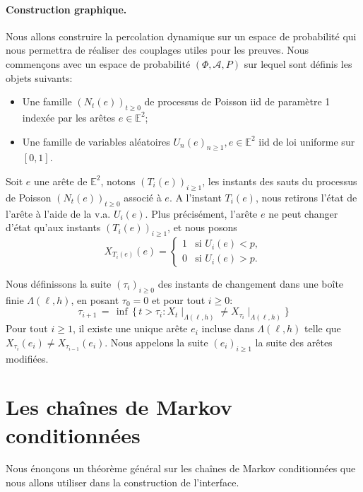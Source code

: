 \documentclass[titlepage,a4paper,12pt]{article}
\begin{document}
\paragraph{Construction graphique.} Nous allons construire la percolation dynamique sur un espace de probabilité qui nous permettra de réaliser des couplages utiles pour les preuves. Nous commençons avec un espace de probabilité $(\Phi, \mathcal{A},P)$ sur lequel sont définis les objets suivants:

\begin{itemize}[label = $\bullet$, leftmargin = *]
\item Une famille $(N_t(e))_{t\geqslant 0}$ de processus de Poisson iid de paramètre 1 indexée par les arêtes $e \in \mathbb{E}^2$;
\item Une famille de variables aléatoires $U_n(e)_{n\geqslant 1}, e\in \mathbb{E}^2$ iid de loi uniforme sur $[0,1]$.
\end{itemize} 


Soit $e$ une arête de $\mathbb{E}^2$, notons $(T_i(e))_{i\geqslant 1}$, les instants des sauts du processus de Poisson $(N_t(e))_{t\geqslant 0}$ associé à $e$. A l'instant $T_i(e)$, nous retirons l'état de l'arête à l'aide de la v.a. $U_i(e)$.
Plus précisément, l'arête $e$ ne peut changer d'état qu'aux instants $(T_i(e))_{i\geqslant 1}$, et nous posons 
$$ X_{T_i(e)}(e) = \left\lbrace \begin{array}{cc}
1 & \text{si }U_i(e) < p, \\
0 & \text{si }U_i(e) > p.
\end{array}
\right.
$$

Nous définissons la suite $(\tau_i)_{i\geqslant 0}$ des instants de changement dans une boîte finie $\Lambda(\ell,h)$, en posant $\tau_0 = 0$ et pour tout $i\geqslant 0$:
$$\tau_{i+1} \,=\, \inf \,\big\{ \, t>\tau_i: {X_t}\mid_{ \Lambda(\ell,h)} \neq {X_{\tau_i}}\mid_{ \Lambda(\ell,h)} \big \}
$$
Pour tout $i\geqslant 1$, il existe une unique arête $e_i$ incluse dans $\Lambda(\ell,h)$ telle que $X_{\tau_i}(e_i) \neq X_{\tau_{i-1}}(e_i)$. Nous appelons la suite $(e_i)_{i\geqslant 1}$ la suite des arêtes modifiées.

\section{Les chaînes de Markov conditionnées}
Nous énonçons un théorème général sur les chaînes de Markov conditionnées que nous allons utiliser dans la construction de l'interface.
\end{document}
